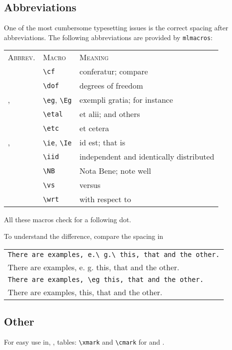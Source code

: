 \subsection{Abbreviations}
One of the most cumbersome typesetting issues is the correct spacing after abbreviations.
The following abbreviations are provided by \verb|mlmacros|:
\begin{center}
	\begin{tabular}{lll}
		\textsc{Abbrev.} & \textsc{Macro} & \textsc{Meaning}\\[.5em]
		\cf & \verb|\cf| & conferatur; compare\\
		\dof & \verb|\dof| & degrees of freedom\\
		\eg, \Eg & \verb|\eg|, \verb|\Eg| & exempli gratia; for instance\\
		\etal & \verb|\etal| & et alii; and others\\
		\etc & \verb|\etc| & et cetera\\
		\ie, \Ie & \verb|\ie|, \verb|\Ie| & id est; that is\\
		\iid & \verb|\iid| & independent and identically distributed\\
		\NB & \verb|\NB| & Nota Bene; note well\\
		\vs & \verb|\vs| & versus\\
		\wrt & \verb|\wrt| & with respect to
	\end{tabular}
\end{center}
All these macros check for a following dot.

To understand the difference, compare the spacing in

\begin{tabular}{l}
	\verb|There are examples, e.\ g.\ this, that and the other.|\\
	There are examples, e. g. this, that and the other.\\
	\verb|There are examples, \eg this, that and the other.|\\
	There are examples, \eg this, that and the other.
\end{tabular}

\subsection{Other}
For easy use in, \eg, tables: \verb|\xmark| and \verb|\cmark| for \xmark and \cmark.